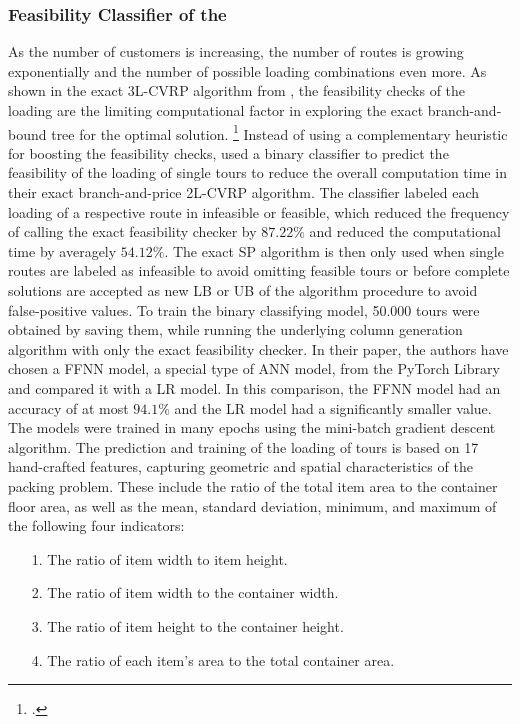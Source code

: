 \subsubsection{Feasibility Classifier of the }
As the number of customers is increasing, the number of routes is growing exponentially and the number of
possible loading combinations even more. As shown in the exact \gls{3L-CVRP} algorithm from \cite{tamke_branch-and-cut_2024},
the feasibility checks of the loading are the limiting computational factor in
exploring the exact branch-and-bound tree for the optimal solution. \footcite[cf.][p. 22]{tamke_branch-and-cut_2024}
Instead of using a complementary heuristic for boosting the feasibility checks,
\textcite{zhang_learning-based_2022} used a binary classifier to predict the feasibility of the
loading of single tours to reduce the overall computation time in their exact branch-and-price \gls{2L-CVRP}
algorithm. The classifier labeled each loading of a respective route in infeasible or feasible, which
reduced the frequency of calling the exact feasibility checker by $87.22\%$ and reduced the computational time by averagely $54.12\%$.
The exact \gls{SP} algorithm is then only used when single routes are labeled as infeasible to avoid
omitting feasible tours or before complete solutions are accepted as new \gls{LB} or \gls{UB} of the
algorithm procedure to avoid false-positive values. To train the binary classifying model,
50.000 tours were obtained by saving them, while running the underlying column generation
algorithm with only the exact feasibility checker. In their paper, the authors have chosen a \gls{FFNN} model, a special type of \gls{ANN} model,
from the PyTorch Library and compared it with a \gls{LR} model. In this comparison, the \gls{FFNN} model had
an accuracy of at most $94.1\%$ and the \gls{LR} model had a significantly smaller value.
The models were trained in many epochs using the mini-batch gradient descent algorithm. The prediction and training
of the loading of tours is based on 17 hand-crafted features, capturing geometric
and spatial characteristics of the packing problem. These include the ratio of the total item area
to the container floor area, as well as the mean, standard deviation, minimum, and maximum of
the following four indicators:
\begin{itemize}
    \item[1.] The ratio of item width to item height.
    \item[2.] The ratio of item width to the container width.
    \item[3.] The ratio of item height to the container height.
    \item[4.] The ratio of each item’s area to the total container area.
\end{itemize}

